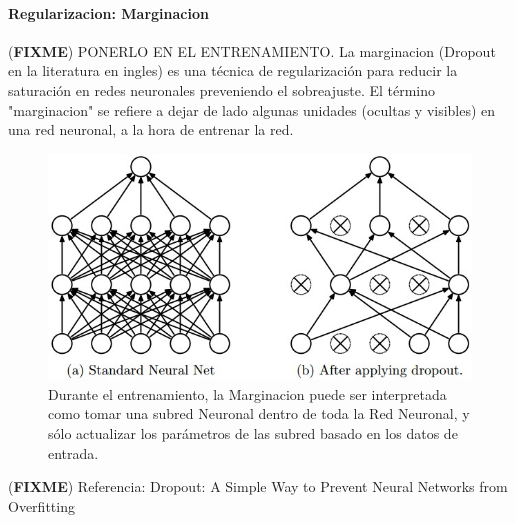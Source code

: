 \documentclass[a4paper,11pt,spanish]{book}
\newcommand*{\FIXME}[1]{{(\textbf{FIXME}) {#1}}}
\begin{document}
      \paragraph {Regularizacion: Marginacion}
      \FIXME{PONERLO EN EL ENTRENAMIENTO.}
      La marginacion (Dropout en la literatura en ingles) es una técnica de regularización para reducir la saturación en redes neuronales preveniendo el sobreajuste.
      El término "marginacion" se refiere a dejar de lado algunas unidades (ocultas y visibles) en una red neuronal, a la hora de entrenar la red.
      \begin{figure}[H]
	\includegraphics[scale=0.5]{./img/dropout.jpeg}
	\caption{Durante el entrenamiento, la Marginacion puede ser interpretada como tomar una subred Neuronal dentro de toda la Red Neuronal, y sólo actualizar los parámetros
	de las subred basado en los datos de entrada.}
	\label{fig:backprop}
      \end{figure}
      \FIXME{Referencia: Dropout: A Simple Way to Prevent Neural Networks from Overfitting}
\end{document}
